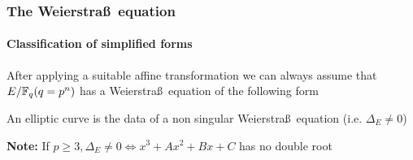 \documentclass[10pt,handout]{beamer} %
\begin{document}
\begin{frame}
\frametitle{The Weierstra\ss\ equation}
\framesubtitle{Classification of simplified forms}

After applying a suitable affine transformation we can always assume that $E/\mathbb F_q (q=p^n)$
has a Weierstra\ss\ equation of the following form\pause

\begin{scriptsize}
\end{scriptsize}\pause

\begin{definition} An elliptic curve is the data of a non
singular Weierstra\ss\ equation (i.e. $\Delta_E\neq0$)
\end{definition}\pause

\small{
\alert{\textbf{Note:} If $p\ge3, \Delta_E\neq0\Leftrightarrow x^3+Ax^2+Bx+C$ has {no} double root}}
\end{frame}
\end{document}
